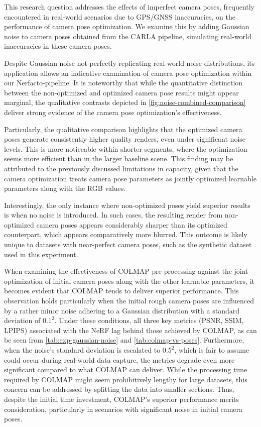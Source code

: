 This research question addresses the effects of imperfect camera poses, frequently encountered in real-world scenarios due to GPS/GNSS inaccuracies, on the performance of camera pose optimization. We examine this by adding Gaussian noise to camera poses obtained from the CARLA pipeline, simulating real-world inaccuracies in these camera poses.

Despite Gaussian noise not perfectly replicating real-world noise distributions, its application allows an indicative examination of camera pose optimization within our Nerfacto-pipeline. It is noteworthy that while the quantitative distinction between the non-optimized and optimized camera pose results might appear marginal, the qualitative contrasts depicted in \autoref{fig:noise-combined-comparison} deliver strong evidence of the camera pose optimization's effectiveness.

Particularly, the qualitative comparison highlights that the optimized camera poses generate consistently higher quality renders, even under significant noise levels. This is more noticeable within shorter segments, where the optimization seems more efficient than in the larger baseline scene. This finding may be attributed to the previously discussed limitations in capacity, given that the camera optimization treats camera pose parameters as jointly optimized learnable parameters along with the RGB values.

Interestingly, the only instance where non-optimized poses yield superior results is when no noise is introduced. In such cases, the resulting render from non-optimized camera poses appears considerably sharper than its optimized counterpart, which appears comparatively more blurred. This outcome is likely unique to datasets with near-perfect camera poses, such as the synthetic dataset used in this experiment.


When examining the effectiveness of COLMAP pre-processing against the joint optimization of initial camera poses along with the other learnable parameters, it becomes evident that COLMAP tends to deliver superior performance. This observation holds particularly when the initial rough camera poses are influenced by a rather minor noise adhering to a Gaussian distribution with a standard deviation of $0.1^2$. Under these conditions, all three key metrics (PSNR, SSIM, LPIPS) associated with the NeRF lag behind those achieved by COLMAP, as can be seen from \autoref{tab:exp-gaussian-noise} and \autoref{tab:colmap-vs-poses}. Furthermore, when the noise's standard deviation is escalated to $0.5^2$, which is fair to assume could occur during real-world data capture, the metrics degrade even more significant compared to what COLMAP can deliver. While the processing time required by COLMAP might seem prohibitively lengthy for large datasets, this concern can be addressed by splitting the data into smaller sections. Thus, despite the initial time investment, COLMAP's superior performance merits consideration, particularly in scenarios with significant noise in initial camera poses.

